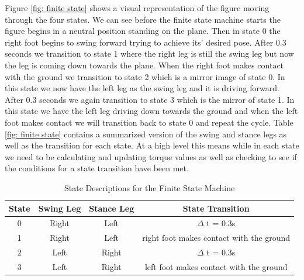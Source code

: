 \documentclass[12pt, a4paper]{article}
\begin{document}
Figure \ref{fig: finite state} shows a visual representation of the figure moving through the four states. We can see before the finite state machine starts the figure begins in a neutral position standing on the plane. Then in state 0 the right foot begins to swing forward trying to achieve its' desired pose. After 0.3 seconds we transition to state 1 where the right leg is still the swing leg but now the leg is coming down towards the plane. When the right foot makes contact with the ground we transition to state 2 which is a mirror image of state 0. In this state we now have the left leg as the swing leg and it is driving forward. After 0.3 seconds we again transition to state 3 which is the mirror of state 1. In this state we have the left leg driving down towards the ground and when the left foot makes contact we will transition back to state 0 and repeat the cycle. Table \ref{fig: finite state} contains a summarized version of the swing and stance legs as well as the transition for each state. At a high level this means while in each state we need to be calculating and updating torque values as well as checking to see if the conditions for a state transition have been met.

\begin{table}[ht]
\caption{State Descriptions for the Finite State Machine}
\begin{center}
\begin{tabular}{|c|c|c|c|}
\hline
State& Swing Leg & Stance Leg& State Transition\\
\hline 
0& Right & Left&  $\Delta$ t = 0.3s\\
\hline
1 &  Right& Left & right foot makes contact with the ground\\
\hline
2 &  Left & Right & $\Delta$ t = 0.3s\\
\hline
3 & Left& Right& left foot makes contact with the ground\\
\hline
\end{tabular}
\end{center}
\label{tbl:state descriptions}
\end{table}
\end{document}
